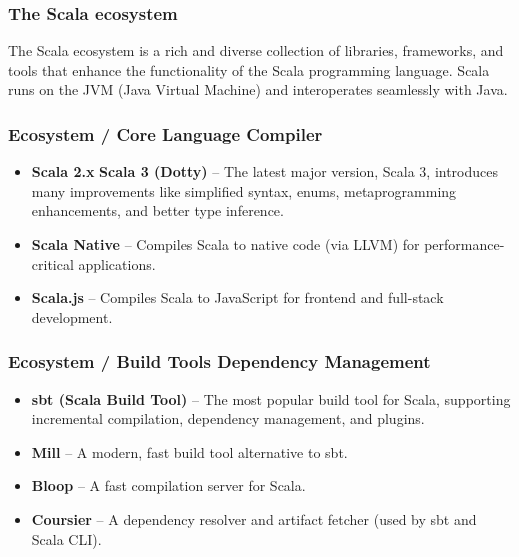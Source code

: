 \documentclass{beamer}
\begin{document}
\begin{frame}
\frametitle{The Scala ecosystem }

The Scala ecosystem is a rich and diverse collection of libraries, frameworks, and tools that enhance the functionality of the Scala programming language. Scala runs on the JVM (Java Virtual Machine) and interoperates seamlessly with Java.

\end{frame}


\begin{frame}
\frametitle{Ecosystem / Core Language \text{\&} Compiler }

\begin{itemize}
    \item \textbf{Scala 2.x} \text{\&} \textbf{Scala 3 (Dotty)} – The latest major version, Scala 3, introduces many improvements like simplified syntax, enums, metaprogramming enhancements, and better type inference.
    \item \textbf{Scala Native} – Compiles Scala to native code (via LLVM) for performance-critical applications.
    \item \textbf{Scala.js} – Compiles Scala to JavaScript for frontend and full-stack development.
\end{itemize}

\end{frame}


\begin{frame}
\frametitle{Ecosystem / Build Tools \text{\&} Dependency Management }

\begin{itemize}
    \item \textbf{sbt (Scala Build Tool)} – The most popular build tool for Scala, supporting incremental compilation, dependency management, and plugins.
    \item \textbf{Mill} – A modern, fast build tool alternative to sbt.
    \item \textbf{Bloop} – A fast compilation server for Scala.
    \item \textbf{Coursier} – A dependency resolver and artifact fetcher (used by sbt and Scala CLI).
\end{itemize}

\end{frame}
\end{document}
